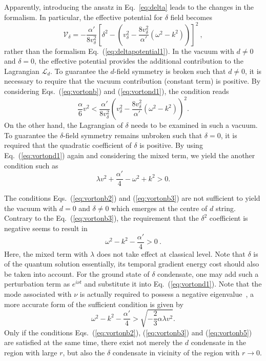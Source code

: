 Apparently, introducing the ansatz in Eq.~\ref{eq:delta} leads to the changes in the formalism.
In particular, the effective potential for $\delta$ field becomes
\begin{equation}
  \label{eq:vortond1}
  \mathcal{V}_\delta= -\frac{\alpha'}{8v_\delta^2} [\delta^2 - (v_\delta^2 - \frac{8v_\delta^2}{\alpha'}(\omega^2 -k^2))]^2 \ ,
\end{equation}
rather than the formalism Eq.~(\ref{eq:deltapotential1}).
In the vacuum with $d \neq 0$ and $\delta = 0$, the effective potential provides the additional
contribution to the Lagrangian $\mathcal{L}_d$. To guarantee the $d$-field symmetry is broken such
that $d \neq 0$, it is necessary to require that the vacuum contribution (constant term) is positive.
By considering Eqs.~(\ref{eq:vortonb}) and (\ref{eq:vortond1}), the condition reads
\begin{equation}
\label{eq:vortonb2}
  \frac{\alpha}{6} v^2 < \frac{\alpha'}{8v_\delta^2}(v_\delta^2  - \frac{8v_\delta^2}{\alpha'}(\omega^2 -k^2))^2.
\end{equation}
On the other hand, the Lagrangian of $\delta$ needs to be examined in such a vacuum. To guarantee the
$\delta$-field symmetry remains unbroken such that $\delta = 0$, it is required that the quadratic
coefficient of $\delta$ is positive. By using Eq.~(\ref{eq:vortond1}) again and considering the mixed
term, we yield the another condition such as
\begin{equation}
  \label{eq:vortonb3}
  \lambda v^2 + \frac{\alpha'}{4}- \omega^2 +k^2 > 0.
\end{equation}

The conditions Eqs.~(\ref{eq:vortonb2}) and (\ref{eq:vortonb3}) are not sufficient to yield the vacuum
with $d = 0$ and $\delta \neq 0$ which emerges at the centre of $d$ string. Contrary to the
Eq.~(\ref{eq:vortonb3}), the requirement that the $\delta^2$ coefficient is negative seems to result in
\begin{equation}
  \label{eq:vortonb4}
\omega^2 - k^2 -\frac{\alpha'}{4} > 0 \ .
\end{equation}
Here, the mixed term with $\lambda$ does not take effect at classical level. Note that $\delta$ is of
the quantum solution essentially, its temporal gradient energy cost should also be taken into account.
For the ground state of $\delta$ condensate, one may add such a perturbation term as $e^{i\nu t}$ and
substitute it into Eq.~(\ref{eq:vortond1}). Note that the mode associated with $\nu$ is actually required
to possess a negative eigenvalue~\cite{vilenkin2000cosmic,haws1988superconducting}, a more accurate form
of the sufficient condition is given by
\begin{equation}
  \label{eq:vortonb5}
  \omega^2 - k^2 -\frac{\alpha'}{4} > \sqrt{- \frac{2}{3}\alpha \lambda v^2}.
\end{equation}
Only if the conditions Eqs.~(\ref{eq:vortonb2}), (\ref{eq:vortonb3}) and (\ref{eq:vortonb5}) are
satisfied at the same time, there exist not merely the $d$ condensate in the region with large $r$, but
also the $\delta$ condensate in vicinity of the region with $r \rightarrow 0$.

